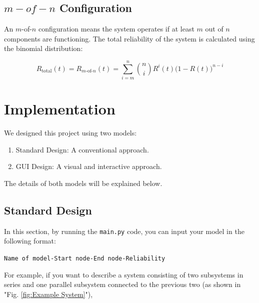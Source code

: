 \documentclass[12pt	]{article}
\begin{document}
\subsection{$m-of-n$ Configuration}
An \(m\)-of-\(n\) configuration means the system operates if at least \(m\) out of \(n\) components are functioning. The total reliability of the system is calculated using the binomial distribution:

\[
R_{\text{total}}(t) = R_{m\text{-of-}n}(t) = \sum_{i=m}^{n} \binom{n}{i} R^i(t) \big(1 - R(t)\big)^{n-i}
\]




\section{Implementation}
We designed this project using two models:
\begin{enumerate}
	\item Standard Design: A conventional approach.
	\item GUI Design: A visual and interactive approach.
\end{enumerate}

The details of both models will be explained below.




\subsection{Standard Design}
In this section, by running the \texttt{main.py} code, you can input your model in the following format:

\begin{center}
	\texttt{Name of model-Start node-End node-Reliability}
\end{center}

For example, if you want to describe a system consisting of two subsystems in series and one parallel subsystem connected to the previous two (as shown in "Fig. \ref{fig:Example System}"),
\end{document}
